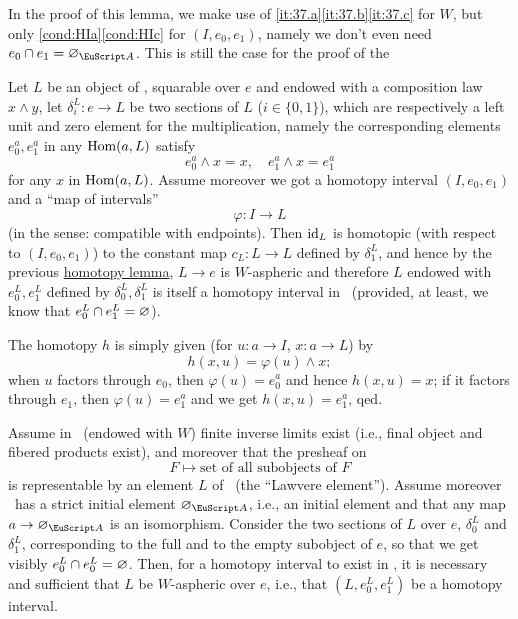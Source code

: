 In the proof of this lemma, we make use of
\ref{it:37.a}\ref{it:37.b}\ref{it:37.c} for $W$, but only
\ref{cond:HIa}\ref{cond:HIc} for $(I,e_0,e_1)$, namely we don't even
need $e_0\sand e_1=\varnothing_\scrA$. This is still the case for the
proof of the
\begin{comparisonlemmaforHI}\label{lem:comparisonlemmaforHI}
  Let $L$ be an object of \scrA, squarable over $e$ and endowed with a
  composition law $x \land y$, let $\delta_i^L:e \to L$ be two sections of
  $L$ \textup($i\in\{0,1\}$\textup), which are respectively a left
  unit and zero element for the multiplication, namely the
  corresponding elements $e_0^a,e_1^a$ in any $\operatorname{Hom}(a,L)$ satisfy
  \[ e_0^a \land x = x, \quad e_1^a\land x = e_1^a\]
  for any $x$ in $\operatorname{Hom}(a,L)$. Assume moreover we got a homotopy
  interval $(I,e_0,e_1)$ and a ``map of intervals''
  \[ \varphi: I \to L\]
  \textup(in the sense: compatible with endpoints\textup). Then
  $\operatorname{id}_L$ is homotopic \textup(with respect to $(I,e_0,e_1)$\textup)
  to the constant map $c_L : L\to L$ defined by $\delta_1^L$, and
  hence by the previous \hyperref[lem:homotopylemma]{homotopy lemma},
  $L\to e$ is $W$-aspheric and therefore $L$ endowed with
  $e_0^L,e_1^L$ defined by $\delta_0^L,\delta_1^L$ is itself a
  homotopy interval in \scrA\ \textup(provided, at least, we know that
  $e_0^L\mathbin{\cap} e_1^L = \varnothing$\textup).
\end{comparisonlemmaforHI}

The homotopy $h$ is simply given (for $u:a\to I$, $x:a\to L$) by
\[ h(x,u) = \varphi(u) \land x;\]
when $u$ factors through $e_0$, then $\varphi(u) = e_0^a$ and hence
$h(x,u)=x$; if it factors through $e_1$, then $\varphi(u)=e_1^a$ and
we get $h(x,u)=e_1^a$, qed.

\begin{corollary}\label{cor:ofcomparisonlemmaforHI}
  Assume in \scrA\ \textup(endowed with $W$\textup) finite inverse limits
  exist \textup(i.e., final object and fibered products exist\textup),
  and moreover that the presheaf on \scrA
  \[F \mapsto \text{set of all subobjects of $F$}\]
  is representable by an element $L$ of \scrA\ \textup(the ``Lawvere
  element''\textup). Assume moreover \scrA\ has a strict initial element
  $\varnothing_\scrA$, i.e., an initial element and that any map
  $a\to\varnothing_\scrA$ is an isomorphism. Consider the two sections
  of $L$ over $e$, $\delta_0^L$ and $\delta_1^L$, corresponding to the
  full and to the empty subobject of $e$, so that we get visibly
  $e_0^L\mathbin{\cap} e_0^L=\varnothing$. Then, for a homotopy interval to exist
  in \scrA, it is necessary and sufficient that $L$ be $W$-aspheric
  over $e$, i.e., that $(L,e_0^L,e_1^L)$ be a homotopy interval.
\end{corollary}


